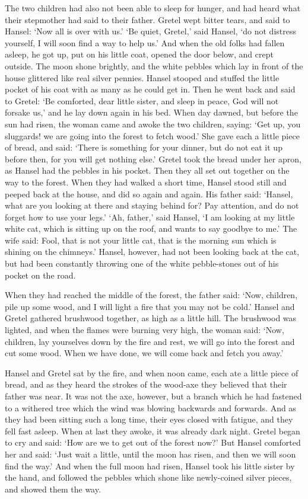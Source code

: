 The two children had also not been able to sleep for hunger, and had heard what their stepmother had said to their father. Gretel wept bitter tears, and said to Hansel: `Now all is over with us.' `Be quiet, Gretel,' said Hansel, `do not distress yourself, I will soon find a way to help us.' And when the old folks had fallen asleep, he got up, put on his little coat, opened the door below, and crept outside. The moon shone brightly, and the white pebbles which lay in front of the house glittered like real silver pennies. Hansel stooped and stuffed the little pocket of his coat with as many as he could get in. Then he went back and said to Gretel: `Be comforted, dear little sister, and sleep in peace, God will not forsake us,' and he lay down again in his bed. When day dawned, but before the sun had risen, the woman came and awoke the two children, saying: `Get up, you sluggards! we are going into the forest to fetch wood.' She gave each a little piece of bread, and said: `There is something for your dinner, but do not eat it up before then, for you will get nothing else.' Gretel took the bread under her apron, as Hansel had the pebbles in his pocket. Then they all set out together on the way to the forest. When they had walked a short time, Hansel stood still and peeped back at the house, and did so again and again. His father said: `Hansel, what are you looking at there and staying behind for? Pay attention, and do not forget how to use your legs.' `Ah, father,' said Hansel, `I am looking at my little white cat, which is sitting up on the roof, and wants to say goodbye to me.' The wife said: Fool, that is not your little cat, that is the morning sun which is shining on the chimneys.' Hansel, however, had not been looking back at the cat, but had been constantly throwing one of the white pebble-stones out of his pocket on the road.

When they had reached the middle of the forest, the father said: `Now, children, pile up some wood, and I will light a fire that you may not be cold.' Hansel and Gretel gathered brushwood together, as high as a little hill. The brushwood was lighted, and when the flames were burning very high, the woman said: `Now, children, lay yourselves down by the fire and rest, we will go into the forest and cut some wood. When we have done, we will come back and fetch you away.'

Hansel and Gretel sat by the fire, and when noon came, each ate a little piece of bread, and as they heard the strokes of the wood-axe they believed that their father was near. It was not the axe, however, but a branch which he had fastened to a withered tree which the wind was blowing backwards and forwards. And as they had been sitting such a long time, their eyes closed with fatigue, and they fell fast asleep. When at last they awoke, it was already dark night. Gretel began to cry and said: `How are we to get out of the forest now?' But Hansel comforted her and said: `Just wait a little, until the moon has risen, and then we will soon find the way.' And when the full moon had risen, Hansel took his little sister by the hand, and followed the pebbles which shone like newly-coined silver pieces, and showed them the way.

